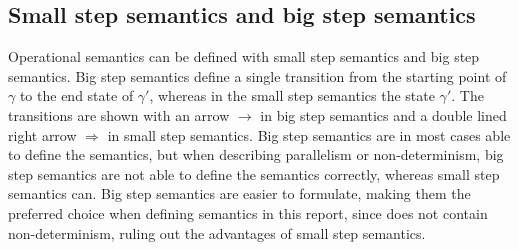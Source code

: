 \subsection{Small step semantics and big step semantics}
Operational semantics can be defined with small step semantics and big step semantics. Big step semantics define a single transition from the starting point of \(\gamma{}\) to the end state of \(\gamma{}'\), whereas in the small step semantics the state \(\gamma'\). The transitions are shown with an arrow \(\rightarrow{}\!\!\) in big step semantics and a double lined right arrow \(\Rightarrow\) in small step semantics. Big step semantics are in most cases able to define the semantics, but when describing parallelism or non-determinism, big step semantics are not able to define the semantics correctly, whereas small step semantics can. Big step semantics are easier to formulate, making them the preferred choice when defining semantics in this report, since \lang{} does not contain non-determinism, ruling out the advantages of small step semantics.